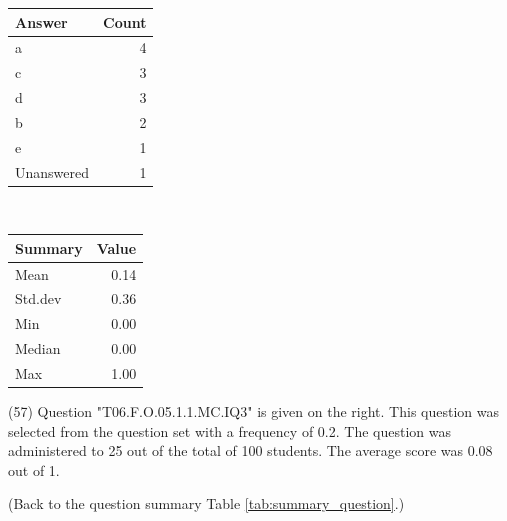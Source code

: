 \documentclass[12pt,nohyper]{tufte-handout}\usepackage[]{graphicx}\usepackage[]{color}
\begin{document}
\begin{center}%
\begin{tabular}{lr}
  \hline
Answer & Count \\ 
  \hline
a &   4 \\ 
  c &   3 \\ 
  d &   3 \\ 
  b &   2 \\ 
  e &   1 \\ 
  Unanswered &   1 \\ 
   \hline
\end{tabular}
~~~~~~~~%
\begin{tabular}{lr}
  \hline
Summary & Value \\ 
  \hline
Mean & 0.14 \\ 
  Std.dev & 0.36 \\ 
  Min & 0.00 \\ 
  Median & 0.00 \\ 
  Max & 1.00 \\ 
   \hline
\end{tabular}
\end{center}\newpage{} (57) Question "T06.F.O.05.1.1.MC.IQ3" is given on the right. This question was selected from the question set with a frequency of 0.2. The question was administered to 25 out of the total of 100 students. The average score was 0.08 out of 1.

 (Back to the question summary Table \ref{tab:summary_question}.)
\end{document}
